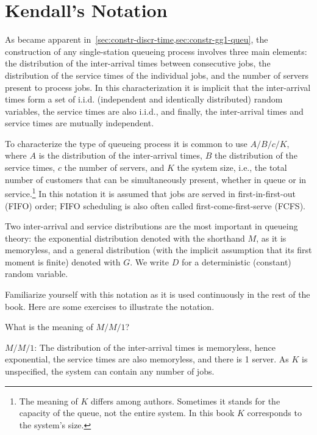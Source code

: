 \section{Kendall's Notation}
\label{sec:kendalls-notation}





As became apparent in~\cref{sec:constr-discr-time,sec:constr-gg1-queu}, the construction of any single-station queueing process involves three main elements: the distribution of the inter-arrival times between consecutive jobs, the distribution of the service times of the individual jobs, and the number of servers present to process jobs.
In this characterization it is implicit that the inter-arrival times form a set of i.i.d.
(independent and identically distributed) random variables, the service times are also i.i.d., and finally, the inter-arrival times and service times are mutually independent.

To characterize the type of queueing process it is common to use 
 $A/B/c/K$, where $A$ is the distribution of the
inter-arrival times, $B$ the distribution of the service times, $c$ the
number of servers, and $K$ the system size, i.e., the total number of customers that can be simultaneously present, whether in queue or in service.\footnote{The meaning of $K$ differs among authors. Sometimes it stands for
  the capacity of the queue, not the entire system. In this book $K$ corresponds to the system's size.}
In this notation it is assumed that jobs are served in
first-in-first-out (FIFO) order; FIFO scheduling is also often called
first-come-first-serve (FCFS). 

Two inter-arrival and service distributions are the most important in queueing theory: the exponential distribution denoted with the shorthand $M$, as it is memoryless, and a general distribution (with the implicit assumption that its first moment is finite) denoted with $G$. We write $D$ for a deterministic (constant) random variable. 

Familiarize yourself with this notation as it is used continuously in the rest of the book. Here are some exercises to illustrate the notation.

\begin{extra}
  What is the meaning of $M/M/1$?
\begin{solution}
$M/M/1$: The distribution of the inter-arrival times is
  memoryless, hence exponential, the service times are also
  memoryless, and there is 1 server. As $K$ is unspecified, the system can contain any number of jobs.
\end{solution}
\end{extra}


